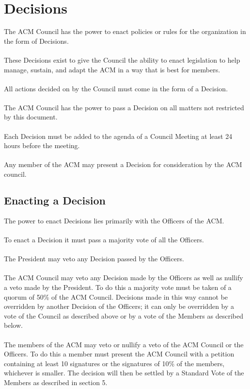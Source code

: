 \documentclass[12pt,titlepage]{article}
\begin{document}
\section{Decisions}

The ACM Council has the power to enact policies or rules for the organization in the form of Decisions.\\
\\
These Decisions exist to give the Council the ability to enact legislation to help manage, sustain, and adapt the ACM in a way that is best for members.\\
\\
All actions decided on by the Council must come in the form of a Decision.\\
\\
The ACM Council has the power to pass a Decision on all matters not restricted by this document.\\
\\
Each Decision must be added to the agenda of a Council Meeting at least 24 hours before the meeting.\\
\\
Any member of the ACM may present a Decision for consideration by the ACM council.

\subsection{Enacting a Decision}

The power to enact Decisions lies primarily with the Officers of the ACM.\\
\\
To enact a Decision it must pass a majority vote of all the Officers.\\
\\
The President may veto any Decision passed by the Officers.\\
\\
The ACM Council may veto any Decision made by the Officers as well as nullify a veto made by the President. To do this a majority vote must be taken of a quorum of 50\% of the ACM Council. Decisions made in this way cannot be overridden by another Decision of the Officers; it can only be overridden by a vote of the Council as described above or by a vote of the Members as described below.\\
\\
The members of the ACM may veto or nullify a veto of the ACM Council or the Officers. To do this a member must present the ACM Council with a petition containing at least 10 signatures or the signatures of 10\% of the members, whichever is smaller. The decision will then be settled by a Standard Vote of the Members as described in section 5.
\end{document}
